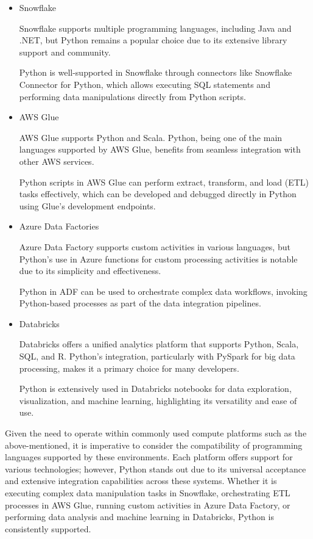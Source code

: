 \begin{itemize}
\item  Snowflake

Snowflake\cite{snowflake} supports multiple programming languages, including Java and .NET, but Python remains a popular choice due to its extensive library support and community.

Python is well-supported in Snowflake through connectors like Snowflake Connector for Python, which allows executing SQL statements and performing data manipulations directly from Python scripts.


\item AWS Glue

    AWS Glue\cite{aws_glue} supports Python and Scala. Python, being one of the main languages supported by AWS Glue, benefits from seamless integration with other AWS services.
    
    Python scripts in AWS Glue can perform extract, transform, and load (ETL) tasks effectively, which can be developed and debugged directly in Python using Glue’s development endpoints.


    \item Azure Data Factories

    Azure Data Factory\cite{azure_data_factory} supports custom activities in various languages, but Python’s use in Azure functions for custom processing activities is notable due to its simplicity and effectiveness.
   
    Python in ADF can be used to orchestrate complex data workflows, invoking Python-based processes as part of the data integration pipelines.


    \item Databricks

    Databricks\cite{databricks} offers a unified analytics platform that supports Python, Scala, SQL, and R. Python’s integration, particularly with PySpark for big data processing, makes it a primary choice for many developers.

    Python is extensively used in Databricks notebooks for data exploration, visualization, and machine learning, highlighting its versatility and ease of use.

\end{itemize}


Given the need to operate within commonly used compute platforms such as the above-mentioned, it is imperative to consider the compatibility of programming languages supported by these environments. Each platform offers support for various technologies; however, Python stands out due to its universal acceptance and extensive integration capabilities across these systems. Whether it is executing complex data manipulation tasks in Snowflake, orchestrating ETL processes in AWS Glue, running custom activities in Azure Data Factory, or performing data analysis and machine learning in Databricks, Python is consistently supported. 

